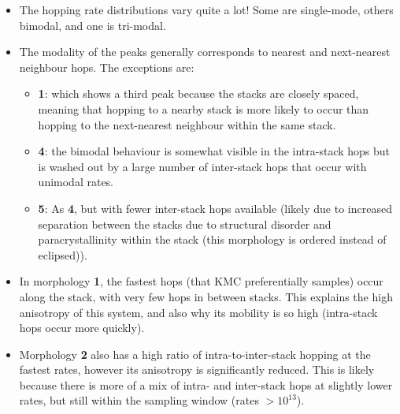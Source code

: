 \documentclass[12pt]{article}
\begin{document}
\begin{itemize}
    \item{The hopping rate distributions vary quite a lot! Some are single-mode, others bimodal, and one is tri-modal.}
    \item{The modality of the peaks generally corresponds to nearest and next-nearest neighbour hops. The exceptions are:
        \begin{itemize}
            \item{\textbf{1}: which shows a third peak because the stacks are closely spaced, meaning that hopping to a nearby stack is more likely to occur than hopping to the next-nearest neighbour within the same stack.}
            \item{\textbf{4}: the bimodal behaviour is somewhat visible in the intra-stack hops but is washed out by a large number of inter-stack hops that occur with unimodal rates.}
            \item{\textbf{5}: As \textbf{4}, but with fewer inter-stack hops available (likely due to increased separation between the stacks due to structural disorder and paracrystallinity within the stack (this morphology is ordered instead of eclipsed)).}
        \end{itemize}}
    \item{In morphology \textbf{1}, the fastest hops (that KMC preferentially samples) occur along the stack, with very few hops in between stacks.
        This explains the high anisotropy of this system, and also why its mobility is so high (intra-stack hops occur more quickly).}
    \item{Morphology \textbf{2} also has a high ratio of intra-to-inter-stack hopping at the fastest rates, however its anisotropy is significantly reduced.
        This is likely because there is more of a mix of intra- and inter-stack hops at slightly lower rates, but still within the sampling window (rates $> 10^{13}$).}

\end{itemize}




\end{document}
